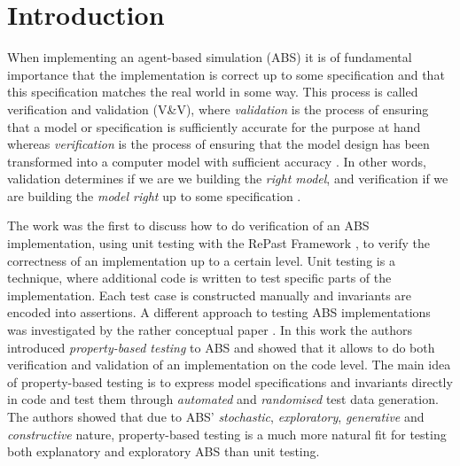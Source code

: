 \section{Introduction}
\label{sec:introduction}
When implementing an agent-based simulation (ABS) it is of fundamental importance that the implementation is correct up to some specification and that this specification matches the real world in some way. This process is called verification and validation (V\&V), where \textit{validation} is the process of ensuring that a model or specification is sufficiently accurate for the purpose at hand whereas \textit{verification} is the process of ensuring that the model design has been transformed into a computer model with sufficient accuracy \cite{robinson_simulation:_2014}. In other words, validation determines if we are we building the \textit{right model}, and verification if we are building the \textit{model right} up to some specification \cite{balci_verification_1998}.

The work \cite{collier_test-driven_2013} was the first to discuss how to do verification of an ABS implementation, using unit testing with the RePast Framework \cite{north_complex_2013}, to verify the correctness of an implementation up to a certain level. Unit testing is a technique, where additional code is written to test specific parts of the implementation. Each test case is constructed manually and invariants are encoded into assertions. A different approach to testing ABS implementations was investigated by the rather conceptual paper \cite{thaler_show_2019}. In this work the authors introduced \textit{property-based testing} to ABS and showed that it allows to do both verification and validation of an implementation on the code level. The main idea of property-based testing is to express model specifications and invariants directly in code and test them through \textit{automated} and \textit{randomised} test data generation. The authors showed that due to ABS' \textit{stochastic}, \textit{exploratory}, \textit{generative} and \textit{constructive} nature, property-based testing is a much more natural fit for testing both explanatory and exploratory ABS than unit testing. 

